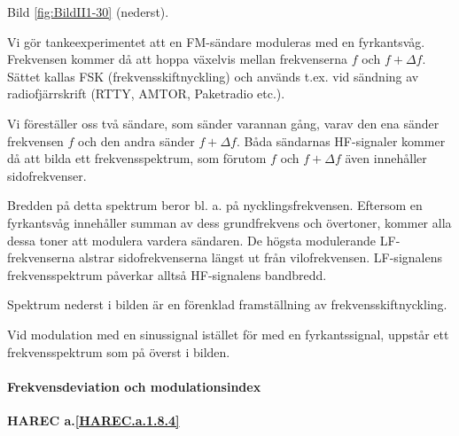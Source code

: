 Bild \ref{fig:BildII1-30} (nederst).

Vi gör tankeexperimentet att en FM-sändare moduleras med en fyrkantsvåg.
Frekvensen kommer då att hoppa växelvis mellan frekvenserna \(f\) och
\(f + \Delta f\). Sättet kallas FSK (frekvensskiftnyckling) och används t.ex.
vid sändning av radiofjärrskrift (RTTY, AMTOR, Paketradio etc.).

Vi föreställer oss två sändare, som sänder varannan gång, varav den ena sänder
frekvensen \(f\) och den andra sänder \(f + \Delta f\). Båda sändarnas
HF-signaler kommer då att bilda ett frekvensspektrum, som förutom \(f\) och
\(f + \Delta f\) även innehåller sidofrekvenser.

Bredden på detta spektrum beror bl. a. på nycklingsfrekvensen. Eftersom en
fyrkantsvåg innehåller summan av dess grundfrekvens och övertoner, kommer alla
dessa toner att modulera vardera sändaren. De högsta modulerande
LF-frekvenserna alstrar sidofrekvenserna längst ut från vilofrekvensen.
LF-signalens frekvensspektrum påverkar alltså HF-signalens bandbredd.

Spektrum nederst i bilden är en förenklad framställning av
frekvensskiftnyckling.

Vid modulation med en sinussignal istället för med en fyrkantssignal, uppstår ett
frekvensspektrum som på överst i bilden.

\paragraph{Frekvensdeviation och modulationsindex}
\textbf{HAREC a.\ref{HAREC.a.1.8.4}\label{myHAREC.a.1.8.4}}

